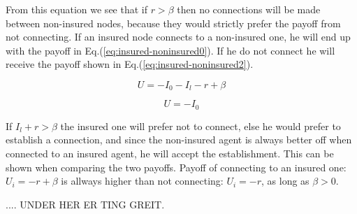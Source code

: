 From this equation we see that if $r>\beta$ then no connections will be made between non-insured nodes, because they would strictly prefer the payoff from not connecting.
If an insured node connects to a non-insured one, he will end up with the payoff in Eq.(\ref{eq:insured-noninsured0}). If he do not connect he will receive the payoff shown in Eq.(\ref{eq:insured-noninsured2}).

\begin{equation}
U= - I_{0} - I_{l} - r + \beta
\label{eq:insured-noninsured0}
\end{equation}

\begin{equation}
U= - I_{0}
\label{eq:insured-noninsured2}
\end{equation}

If $I_{l}+r>\beta$ the insured one will prefer not to connect, else he would prefer to establish a connection, and since the non-insured agent is always better off when connected to an insured agent, he will accept the establishment. This can be shown when comparing the two payoffs. Payoff of connecting to an insured one: $U_{i}=- r + \beta$ is allways higher than not connecting: $U_{i}= - r$, as long as $\beta>0$.


.... UNDER HER ER TING GREIT. 



